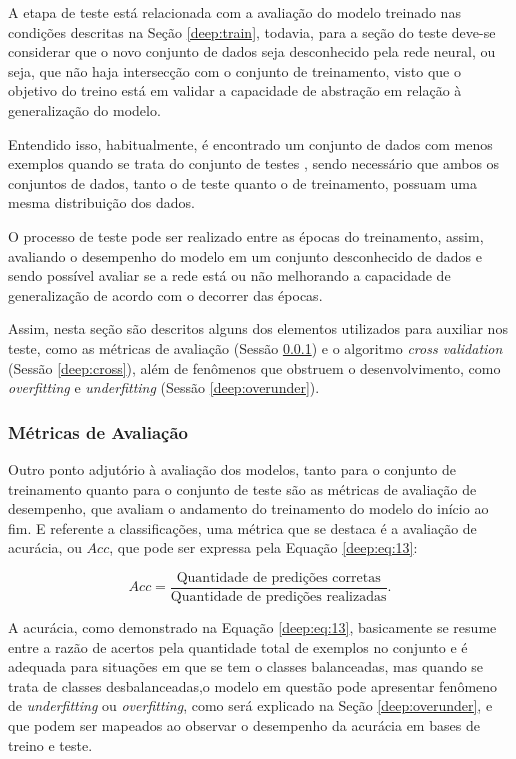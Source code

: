 A etapa de teste está relacionada com a avaliação do modelo treinado nas condições descritas na Seção \ref{deep:train}, todavia, para a seção do teste deve-se considerar que o novo conjunto de dados seja desconhecido pela rede neural, ou seja, que não haja intersecção com o conjunto de treinamento, visto que o objetivo do treino está em validar a capacidade de abstração em relação à generalização do modelo.

Entendido isso, habitualmente, é encontrado um conjunto de dados com menos exemplos quando se trata do conjunto de testes \cite{Goodfellow2016}, sendo necessário que ambos os conjuntos de dados, tanto o de teste quanto o de treinamento, possuam uma mesma distribuição dos dados.

O processo de teste pode ser realizado entre as épocas do treinamento, assim, avaliando o desempenho do modelo em um conjunto desconhecido de dados e sendo possível avaliar se a rede está ou não melhorando a capacidade de generalização de acordo com o decorrer das épocas.

Assim, nesta seção são descritos alguns dos elementos utilizados para auxiliar nos teste, como as métricas de avaliação (Sessão \ref{deep:metrics}) e o algoritmo \textit{cross validation} (Sessão \ref{deep:cross}), além de fenômenos que obstruem o desenvolvimento, como \textit{overfitting} e \textit{underfitting} (Sessão \ref{deep:overunder}).


\subsubsection{Métricas de Avaliação}
\label{deep:metrics}

Outro ponto adjutório à avaliação dos modelos, tanto para o conjunto de treinamento quanto para o conjunto de teste são as métricas de avaliação de desempenho, que avaliam o andamento do treinamento do modelo do início ao fim. E referente a classificações, uma métrica que se destaca é a avaliação de acurácia, ou $Acc$, que pode ser expressa pela Equação \ref{deep:eq:13}:

\begin{equation}
    \label{deep:eq:13}
    Acc = \frac{\text{Quantidade de predições corretas}}{\text{Quantidade de predições realizadas}}.
\end{equation}

A acurácia, como demonstrado na Equação \ref{deep:eq:13}, basicamente se resume entre a razão de acertos pela quantidade total de exemplos no conjunto e é adequada para situações em que se tem o classes balanceadas, mas quando se trata de classes desbalanceadas,o modelo em questão pode apresentar fenômeno de \textit{underfitting} ou \textit{overfitting}, como será explicado na Seção \ref{deep:overunder}, e que podem ser mapeados ao observar o desempenho da acurácia em bases de treino e teste.

